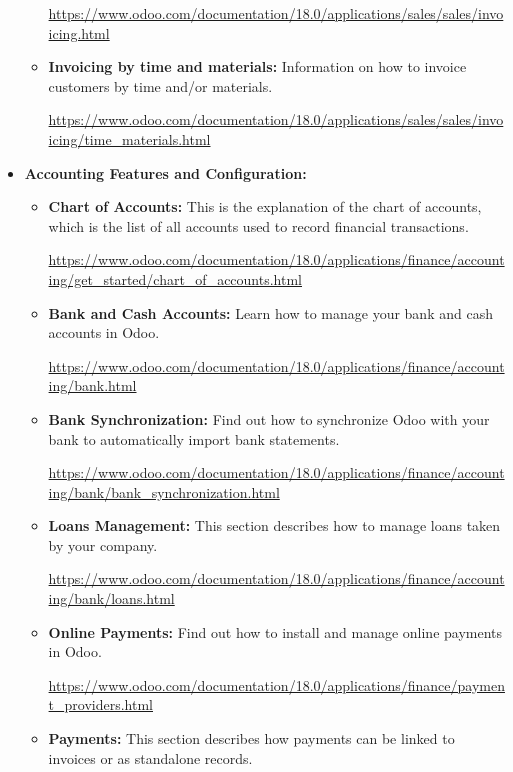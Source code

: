 \documentclass[11pt,a4paper]{article}
\begin{document}
\begin{itemize}
\begin{itemize}
        \url{https://www.odoo.com/documentation/18.0/applications/sales/sales/invoicing.html}
	
        \item \textbf{Invoicing by time and materials:} Information on how to invoice customers by time and/or materials. 
        
        \url{https://www.odoo.com/documentation/18.0/applications/sales/sales/invoicing/time\_materials.html}
    \end{itemize}
    \item \textbf{Accounting Features and Configuration:}
    \begin{itemize}
        \item \textbf{Chart of Accounts:} This is the explanation of the chart of accounts, which is the list of all accounts used to record financial transactions. 
        
        \url{https://www.odoo.com/documentation/18.0/applications/finance/accounting/get\_started/chart\_of\_accounts.html}

        \item \textbf{Bank and Cash Accounts:} Learn how to manage your bank and cash accounts in Odoo. 
        
        \url{https://www.odoo.com/documentation/18.0/applications/finance/accounting/bank.html}

        \item \textbf{Bank Synchronization:} Find out how to synchronize Odoo with your bank to automatically import bank statements. 
        
        \url{https://www.odoo.com/documentation/18.0/applications/finance/accounting/bank/bank\_synchronization.html}

        \item \textbf{Loans Management:} This section describes how to manage loans taken by your company. 
        
        \url{https://www.odoo.com/documentation/18.0/applications/finance/accounting/bank/loans.html}

        \item \textbf{Online Payments:} Find out how to install and manage online payments in Odoo. 
        
        \url{https://www.odoo.com/documentation/18.0/applications/finance/payment\_providers.html}

        \item \textbf{Payments:} This section describes how payments can be linked to invoices or as standalone records. 
        

\end{itemize}
\end{itemize}
\end{document}
